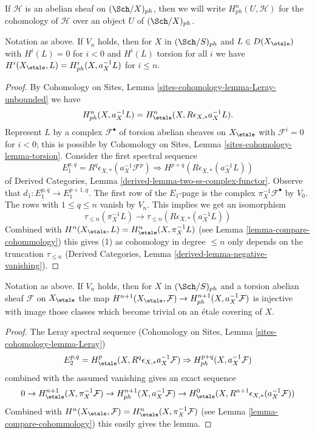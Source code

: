 \noindent
If $\mathcal{H}$ is an abelian sheaf on $(\Sch/X)_{ph}$,
then we will write $H^n_{ph}(U, \mathcal{H})$ for the cohomology
of $\mathcal{H}$ over an object $U$ of $(\Sch/X)_{ph}$.

\begin{lemma}
\label{lemma-V-implies-cohomology-etale-ph}
Notation as above. If $V_n$ holds, then for
$X$ in $(\Sch/S)_{ph}$ and $L \in D(X_\etale)$
with $H^i(L) = 0$ for $i < 0$ and $H^i(L)$ torsion for all $i$
we have $H^i(X_\etale, L) = H^i_{ph}(X, a_X^{-1}L)$ for $i \leq n$.
\end{lemma}

\begin{proof}
By Cohomology on Sites, Lemma \ref{sites-cohomology-lemma-Leray-unbounded}
we have
$$
H^n_{ph}(X, a_X^{-1}L) = H^n_\etale(X, R\epsilon_{X, *}a_X^{-1}L).
$$
Represent $L$ by a complex $\mathcal{F}^\bullet$ of torsion abelian
sheaves on $X_\etale$ with $\mathcal{F}^i = 0$ for $i < 0$; this is
possible by Cohomology on Sites, Lemma \ref{sites-cohomology-lemma-torsion}.
Consider the first spectral sequence
$$
E_1^{p, q} = R^q\epsilon_{X, *}(a_X^{-1}\mathcal{F}^p)
\Rightarrow H^{p + q}(R\epsilon_{X, *}(a_X^{-1}L))
$$
of Derived Categories, Lemma \ref{derived-lemma-two-ss-complex-functor}.
Observe that $d_1 : E_1^{p, q} \to E_1^{p + 1, q}$.
The first row of the $E_1$-page is the complex
$\pi_X^{-1}\mathcal{F}^\bullet$ by $V_0$.
The rows with $1 \leq q \leq n$ vanish by $V_n$.
This implies we get an isomorphism
$$
\tau_{\leq n}(\pi_X^{-1} L)
\longrightarrow
\tau_{\leq n}(R\epsilon_{X, *}(a_X^{-1}L))
$$
Combined with $H^n(X_\etale, L) = H^n_\etale(X, \pi_X^{-1}L)$
(see Lemma \ref{lemma-compare-cohommology}) this
gives (1) as cohomology in degree $\leq n$ only depends on the truncation
$\tau_{\leq n}$ (Derived Categories, Lemma
\ref{derived-lemma-negative-vanishing}).
\end{proof}

\begin{lemma}
\label{lemma-V-implies-cohomology-etale-ph-extra}
Notation as above. If $V_n$ holds, then for
$X$ in $(\Sch/S)_{ph}$ and a torsion abelian sheaf $\mathcal{F}$ on $X_\etale$
the map
$H^{n + 1}(X_\etale, \mathcal{F}) \to H^{n + 1}_{ph}(X, a_X^{-1}\mathcal{F})$
is injective with image those classes which become trivial on
an \'etale covering of $X$.
\end{lemma}

\begin{proof}
The Leray spectral sequence (Cohomology on Sites, Lemma
\ref{sites-cohomology-lemma-Leray})
$$
E_2^{p, q} = H^p_\etale(X, R^q\epsilon_{X, *}a_X^{-1}\mathcal{F})
\Rightarrow
H^{p + q}_{ph}(X, a_X^{-1}\mathcal{F})
$$
combined with the assumed vanishing gives an exact sequence
$$
0 \to
H^{n + 1}_\etale(X, \pi_X^{-1}\mathcal{F}) \to
H^{n + 1}_{ph}(X, a_X^{-1}\mathcal{F}) \to
H^0_\etale(X, R^{n + 1}\epsilon_{X, *}(a_X^{-1}\mathcal{F}))
$$
Combined with
$H^n(X_\etale, \mathcal{F}) = H^n_\etale(X, \pi_X^{-1}\mathcal{F})$
(see Lemma \ref{lemma-compare-cohommology}) this easily gives the lemma.
\end{proof}

